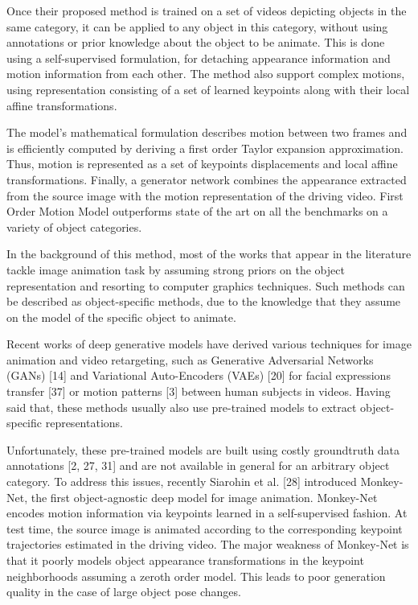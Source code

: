 \documentclass[english,12pt]{article}
\begin{document}
Once their proposed method is trained on a set of videos depicting objects in the same category, it can be
applied to any object in this category, without using annotations or prior knowledge about the object to be
animate.
This is done using a self-supervised formulation, for detaching appearance information and motion information
from each other. The method also support complex motions, using representation consisting of a set of learned
keypoints along with their local affine transformations.

The model's mathematical formulation describes motion between two frames and is efficiently computed by
deriving a first order Taylor expansion approximation. Thus, motion is represented as a set of keypoints
displacements and local affine transformations.
Finally, a generator network combines the appearance extracted from the source image with the motion
representation of the driving video. First Order Motion Model outperforms state of the art on all the
benchmarks on a variety of object categories.

In the background of this method, most of the works that appear in the literature tackle image animation
task by assuming strong priors on the object representation and resorting to computer graphics techniques.
Such methods can be described as object-specific methods, due to the knowledge that they assume on the
model of the specific object to animate.

Recent works of deep generative models have derived various techniques for image animation and video
retargeting, such as Generative Adversarial Networks (GANs) [14] and Variational Auto-Encoders (VAEs)
[20] for facial expressions transfer [37] or motion patterns [3] between human subjects in videos.
Having said that, these methods usually also use pre-trained models to extract object-specific
representations.

Unfortunately, these pre-trained models are built using costly groundtruth data annotations [2, 27, 31]
and are not available in general for an arbitrary object category. To address this issues, recently
Siarohin et al. [28] introduced Monkey-Net, the first object-agnostic deep model for image animation.
Monkey-Net encodes motion information via keypoints learned in a self-supervised fashion. At test time,
the source image is animated according to the corresponding keypoint trajectories estimated in the driving
video. The major weakness of Monkey-Net is that it poorly models object appearance transformations in the
keypoint neighborhoods assuming a zeroth order model. This leads to poor generation
quality in the case of large object pose changes.
\end{document}
